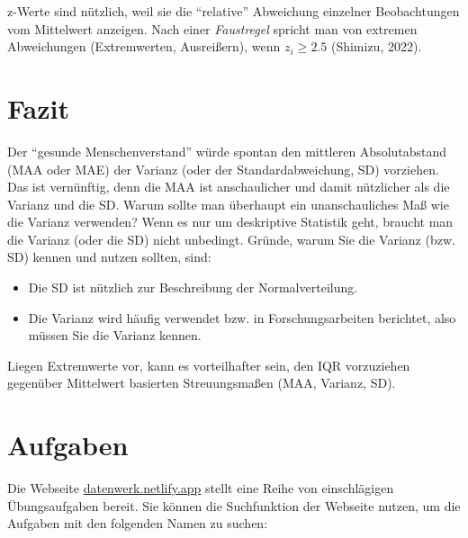 \documentclass[
  letterpaper,
  oneside,
  open=any]{scrbook}
\providecommand{\tightlist}{%
  \setlength{\itemsep}{0pt}\setlength{\parskip}{0pt}}\usepackage{longtable,booktabs,array}
\theoremstyle{definition}
\theoremstyle{definition}
\theoremstyle{definition}
\theoremstyle{remark}
\begin{document}
z-Werte sind nützlich, weil sie die \enquote{relative} Abweichung
einzelner Beobachtungen vom Mittelwert anzeigen. Nach einer
\emph{Faustregel} spricht man von extremen Abweichungen (Extremwerten,
Ausreißern), wenn \(z_i \ge 2.5\) (Shimizu, 2022).

\section{Fazit}\label{fazit-2}

Der \enquote{gesunde Menschenverstand} würde spontan den mittleren
Absolutabstand (MAA oder MAE) der Varianz (oder der Standardabweichung,
SD) vorziehen. Das ist vernünftig, denn die MAA ist anschaulicher und
damit nützlicher als die Varianz und die SD. Warum sollte man überhaupt
ein unanschauliches Maß wie die Varianz verwenden? Wenn es nur um
deskriptive Statistik geht, braucht man die Varianz (oder die SD) nicht
unbedingt. Gründe, warum Sie die Varianz (bzw. SD) kennen und nutzen
sollten, sind:

\begin{itemize}
\tightlist
\item
  Die SD ist nützlich zur Beschreibung der Normalverteilung.
\item
  Die Varianz wird häufig verwendet bzw. in Forschungsarbeiten
  berichtet, also müssen Sie die Varianz kennen.
\end{itemize}

Liegen Extremwerte vor, kann es vorteilhafter sein, den IQR vorzuziehen
gegenüber Mittelwert basierten Streuungsmaßen (MAA, Varianz, SD).

\section{Aufgaben}\label{aufgaben-5}

Die Webseite \href{https://datenwerk.netlify.app}{datenwerk.netlify.app}
stellt eine Reihe von einschlägigen Übungsaufgaben bereit. Sie können
die Suchfunktion der Webseite nutzen, um die Aufgaben mit den folgenden
Namen zu suchen:
\end{document}
